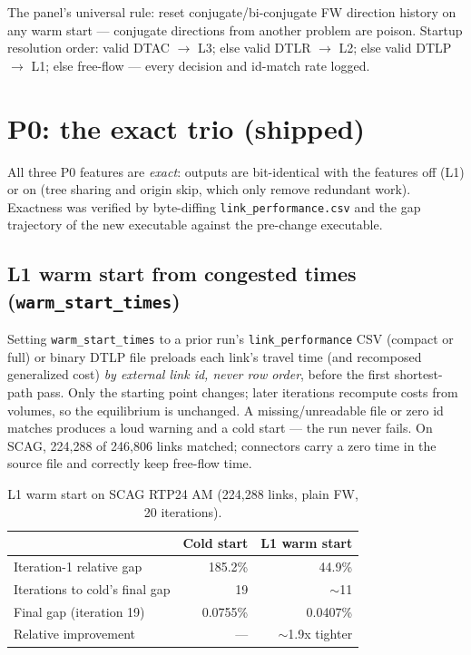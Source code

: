 \documentclass[10pt]{article}
\newcommand{\code}[1]{\texttt{#1}}
\begin{document}
The panel's universal rule: reset conjugate/bi-conjugate FW direction history on
any warm start --- conjugate directions from another problem are poison.
Startup resolution order: valid DTAC $\rightarrow$ L3; else valid DTLR
$\rightarrow$ L2; else valid DTLP $\rightarrow$ L1; else free-flow --- every
decision and id-match rate logged.

\section{P0: the exact trio (shipped)}
\label{sec:p0}

All three P0 features are \emph{exact}: outputs are bit-identical with the
features off (L1) or on (tree sharing and origin skip, which only remove
redundant work). Exactness was verified by byte-diffing
\code{link\_performance.csv} and the gap trajectory of the new executable
against the pre-change executable.

\subsection{L1 warm start from congested times (\code{warm\_start\_times})}

Setting \code{warm\_start\_times} to a prior run's \code{link\_performance} CSV
(compact or full) or binary DTLP file preloads each link's travel time (and
recomposed generalized cost) \emph{by external link id, never row order},
before the first shortest-path pass. Only the starting point changes; later
iterations recompute costs from volumes, so the equilibrium is unchanged.
A missing/unreadable file or zero id matches produces a loud warning and a
cold start --- the run never fails. On SCAG, 224{,}288 of 246{,}806 links
matched; connectors carry a zero time in the source file and correctly keep
free-flow time.

\begin{table}[h]
\centering
\caption{L1 warm start on SCAG RTP24 AM (224{,}288 links, plain FW, 20 iterations).}
\label{tab:l1}
\begin{tabular}{lrr}
\toprule
 & Cold start & L1 warm start \\
\midrule
Iteration-1 relative gap        & 185.2\%          & 44.9\% \\
Iterations to cold's final gap  & 19               & $\sim$11 \\
Final gap (iteration 19)        & 0.0755\%         & 0.0407\% \\
Relative improvement            & ---              & $\sim$1.9x tighter \\
\bottomrule
\end{tabular}
\end{table}
\end{document}
